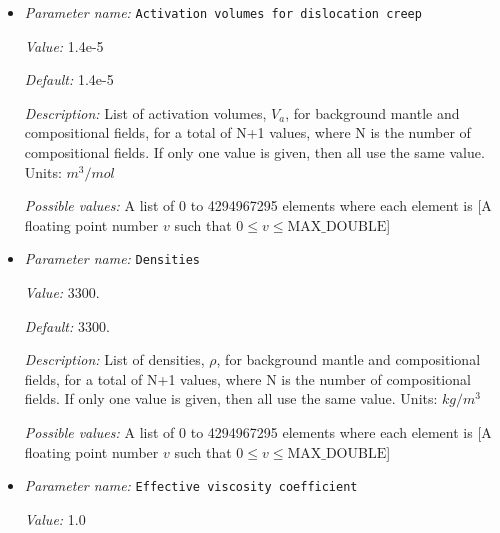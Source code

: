 \begin{itemize}
{\it Description:} List of activation volumes, $V_a$, for background mantle and compositional fields, for a total of N+1 values, where N is the number of compositional fields. If only one value is given, then all use the same value.  Units: $m^3 / mol$


{\it Possible values:} A list of 0 to 4294967295 elements where each element is [A floating point number $v$ such that $0 \leq v \leq \text{MAX\_DOUBLE}$]
\item {\it Parameter name:} {\tt Activation volumes for dislocation creep}
\label{parameters:Material model/Diffusion dislocation/Activation volumes for dislocation creep}


{\it Value:} 1.4e-5


{\it Default:} 1.4e-5


{\it Description:} List of activation volumes, $V_a$, for background mantle and compositional fields, for a total of N+1 values, where N is the number of compositional fields. If only one value is given, then all use the same value.  Units: $m^3 / mol$


{\it Possible values:} A list of 0 to 4294967295 elements where each element is [A floating point number $v$ such that $0 \leq v \leq \text{MAX\_DOUBLE}$]
\item {\it Parameter name:} {\tt Densities}
\label{parameters:Material model/Diffusion dislocation/Densities}


{\it Value:} 3300.


{\it Default:} 3300.


{\it Description:} List of densities, $\rho$, for background mantle and compositional fields, for a total of N+1 values, where N is the number of compositional fields. If only one value is given, then all use the same value.  Units: $kg / m^3$


{\it Possible values:} A list of 0 to 4294967295 elements where each element is [A floating point number $v$ such that $0 \leq v \leq \text{MAX\_DOUBLE}$]
\item {\it Parameter name:} {\tt Effective viscosity coefficient}
\label{parameters:Material model/Diffusion dislocation/Effective viscosity coefficient}


{\it Value:} 1.0



\end{itemize}
